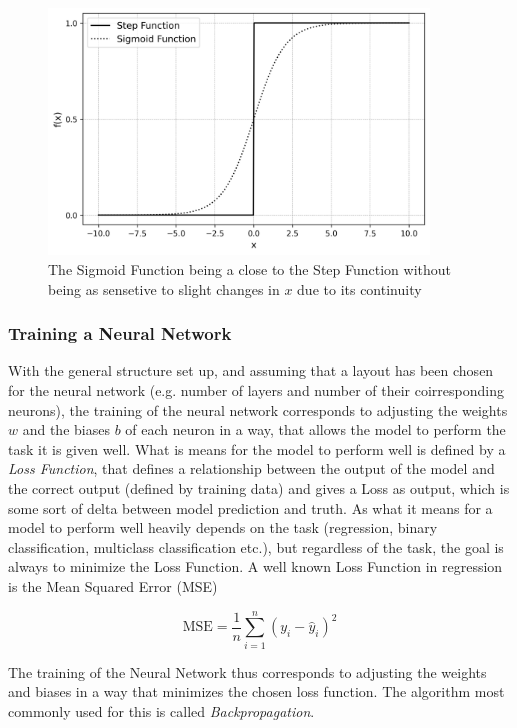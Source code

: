 \begin{figure}[h] 
	\centering
	\includegraphics[width=0.9\textwidth]{figures/modelling/activation_functions.png} %
	\caption{The Sigmoid Function being a close to the Step Function without being as sensetive to slight changes in $x$ due to its continuity}
	\label{fig:activation_functions}
\end{figure}

\cite{nielsen2015neural}


\subsubsection{Training a Neural Network}

With the general structure set up, and assuming that a layout has been chosen for the neural network (e.g. number of layers and number of their coirresponding neurons), the training of the neural network corresponds to adjusting the weights $w$ and the biases $b$ of each neuron in a way, that allows the model to perform the task it is given well. What is means for the model to perform well is defined by a \textit{Loss Function}, that defines a relationship between the output of the model and the correct output (defined by training data) and gives a Loss as output, which is some sort of delta between model prediction and truth. As what it means for a model to perform well heavily depends on the task (regression, binary classification, multiclass classification etc.), but regardless of the task, the goal is always to minimize the Loss Function. A well known Loss Function in regression is the Mean Squared Error (MSE)

\[
\text{MSE} = \frac{1}{n} \sum_{i=1}^{n} (y_i - \hat{y}_i)^2
\]

The training of the Neural Network thus corresponds to adjusting the weights and biases in a way that minimizes the chosen loss function. The algorithm most commonly used for this is called \textit{Backpropagation}.
 \cite{nielsen2015neural}
 
